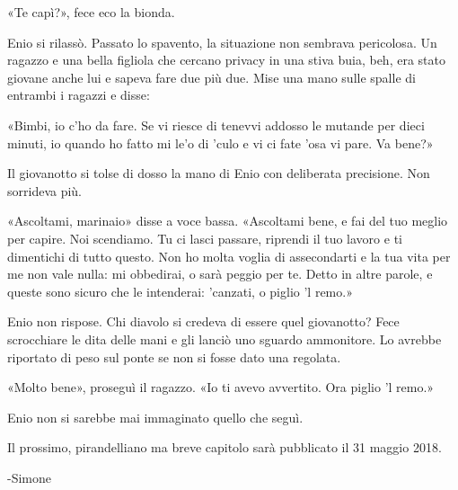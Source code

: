 «Te capì?», fece eco la bionda.

Enio si rilassò. Passato lo spavento, la situazione non sembrava pericolosa. Un ragazzo e una bella figliola che cercano privacy in una stiva buia, beh, era stato giovane anche lui e sapeva fare due più due. Mise una mano sulle spalle di entrambi i ragazzi e disse:

«Bimbi, io c'ho da fare. Se vi riesce di tenevvi addosso le mutande per dieci minuti, io quando ho fatto mi le'o di 'culo e vi ci fate 'osa vi pare. Va bene?»

Il giovanotto si tolse di dosso la mano di Enio con deliberata precisione. Non sorrideva più.

«Ascoltami, marinaio» disse a voce bassa. «Ascoltami bene, e fai del tuo meglio per capire. Noi scendiamo. Tu ci lasci passare, riprendi il tuo lavoro e ti dimentichi di tutto questo. Non ho molta voglia di assecondarti e la tua vita per me non vale nulla: mi obbedirai, o sarà peggio per te. Detto in altre parole, e queste sono sicuro che le intenderai: 'canzati, o piglio 'l remo.»

Enio non rispose. Chi diavolo si credeva di essere quel giovanotto? Fece scrocchiare le dita delle mani e gli lanciò uno sguardo ammonitore. Lo avrebbe riportato di peso sul ponte se non si fosse dato una regolata.

«Molto bene», proseguì il ragazzo. «Io ti avevo avvertito. Ora piglio 'l remo.»

Enio non si sarebbe mai immaginato quello che seguì.

Il prossimo, pirandelliano ma breve capitolo sarà pubblicato il 31 maggio 2018.

-Simone



